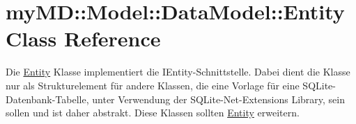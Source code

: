 \hypertarget{classmy_m_d_1_1_model_1_1_data_model_1_1_entity}{
\section{my\-MD::Model::Data\-Model::Entity Class Reference}
\label{d7/d0a/classmy_m_d_1_1_model_1_1_data_model_1_1_entity}
}
Die \hyperlink{classmy_m_d_1_1_model_1_1_data_model_1_1_entity}{Entity} Klasse implementiert die IEntity-Schnittstelle. Dabei dient die Klasse nur als Strukturelement f\"{u}r andere Klassen, die eine Vorlage f\"{u}r eine SQLite-Datenbank-Tabelle, unter Verwendung der SQLite-Net-Extensions Library, sein sollen und ist daher abstrakt. Diese Klassen sollten \hyperlink{classmy_m_d_1_1_model_1_1_data_model_1_1_entity}{Entity} erweitern.  


